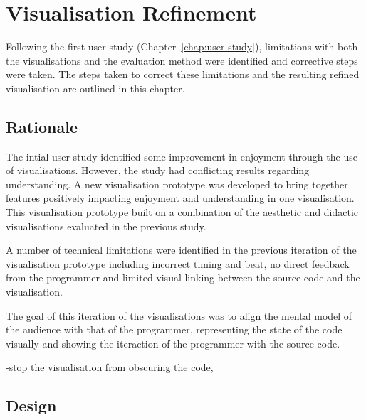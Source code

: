 
\chapter{Visualisation Refinement}
\label{chap:visualisation-refinement}

Following the first user study (Chapter~\ref{chap:user-study}), limitations with both the visualisations and the evaluation method were identified and corrective steps were taken. The steps taken to correct these limitations and the resulting refined visualisation are outlined in this chapter.

\section{Rationale}

\more

The intial user study identified some improvement in enjoyment through the use of visualisations. However, the study had conflicting results regarding understanding. A new visualisation prototype was developed to bring together features positively impacting enjoyment and understanding in one visualisation. This visualisation prototype built on a combination of the aesthetic and didactic visualisations evaluated in the previous study.



A number of technical limitations were identified in the previous iteration of the visualisation prototype including incorrect timing and beat, no direct feedback from the programmer and limited visual linking between the source code and the visualisation.

The goal of this iteration of the visualisations was to align the mental model of the audience with that of the programmer, representing the state of the code visually and showing the iteraction of the programmer with the source code.



-stop the visualisation from obscuring the code, 

\section{Design}


